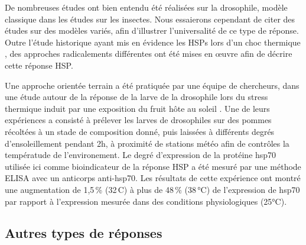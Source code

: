 

		De nombreuses études ont bien entendu été réalisées sur la drosophile, modèle classique dans les études sur les insectes.
		Nous essaierons cependant de citer des études sur des modèles variés, afin d'illustrer l'universalité de ce type de réponse.
		Outre l'étude historique ayant mis en évidence les HSPs lors d'un choc thermique \cite{tissieres1974}, 
		des approches radicalements différentes ont été mises en \oe{}uvre afin de décrire cette réponse HSP.

		Une approche orientée terrain a été pratiquée par une équipe de chercheurs, dans une étude autour de la réponse de la larve de la drosophile lors du stress thermique induit par une exposition du fruit hôte au soleil \cite{feder1997}.
		Une de leurs expériences a consisté à prélever les larves de drosophiles sur des pommes récoltées à un stade de composition donné, puis laissées à différents degrés d'ensoleillement pendant 2h, à proximité de stations météo afin de contrôles la températude de l'environement.
		Le degré d'expression de la protéine hsp70 utilisée ici comme bioindicateur de la réponse HSP a été mesuré par une méthode ELISA avec un anticorps anti-hsp70.
		Les résultats de cette expérience ont montré une augmentation de 1,5\,\% (32\,\degres{}C) à plus de 48\,\% (38\,°C) de l'expression de hsp70 par rapport à l'expression mesurée dans des conditions physiologiques (25°C). %



		\subsection{Autres types de réponses} %

